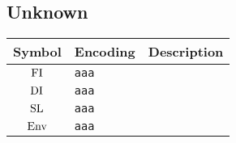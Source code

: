 \documentclass[11pt]{article}
\begin{document}
\subsection{Unknown}

\begin{table}[H]
	\def\arraystretch{1.5}
	\begin{tabular}{c l l}
		\textbf{Symbol} & \textbf{Encoding} & \textbf{Description} \\
		\hline
		$\mathop{\mathrm{FI}}\nolimits$ & \texttt{aaa} &  \\
		$\mathop{\mathrm{DI}}\nolimits$ & \texttt{aaa} &  \\
		$\mathop{\mathrm{SL}}\nolimits$ & \texttt{aaa} &  \\
		$\mathord{\mathrm{Env}}$ & \texttt{aaa} &  \\
	\end{tabular} 
\end{table}
\end{document}
